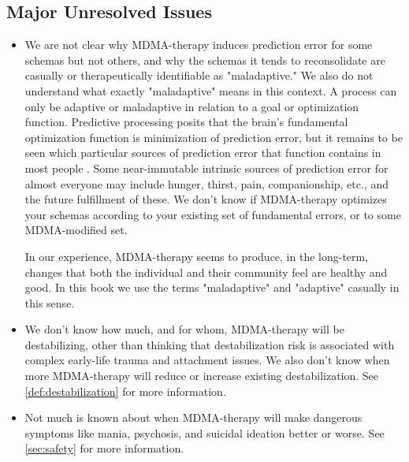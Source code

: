 \documentclass[12pt,letterpaper]{book}
\begin{document}
\subsection*{Major Unresolved Issues}
\begin{itemize}
    \item We are not clear why MDMA-therapy induces prediction error for some schemas but not others, and why the schemas it tends to reconsolidate are casually or therapeutically identifiable as "maladaptive." We also do not understand what exactly "maladaptive" means in this context. A process can only be adaptive or maladaptive in relation to a goal or optimization function. Predictive processing posits that the brain's fundamental optimization function is minimization of prediction error, but it remains to be seen which particular sources of prediction error that function contains in most people \cite{clark2015surfing}. Some near-immutable intrinsic sources of prediction error for almost everyone may include hunger, thirst, pain, companionship, etc., and the future fulfillment of these. We don't know if MDMA-therapy optimizes your schemas according to your existing set of fundamental errors, or to some MDMA-modified set.
    
    In our experience, MDMA-therapy seems to produce, in the long-term, changes that both the individual and their community feel are healthy and good. In this book we use the terms "maladaptive" and "adaptive" casually in this sense.
    \item We don't know how much, and for whom, MDMA-therapy will be destabilizing, other than thinking that destabilization risk is associated with complex early-life trauma and attachment issues. We also don't know when more MDMA-therapy will reduce or increase existing destabilization. See \ref{def:destabilization} for more information.
    \item Not much is known about when MDMA-therapy will make dangerous symptoms like mania, psychosis, and suicidal ideation better or worse. See \ref{sec:safety} for more information.
\end{itemize}
\end{document}
